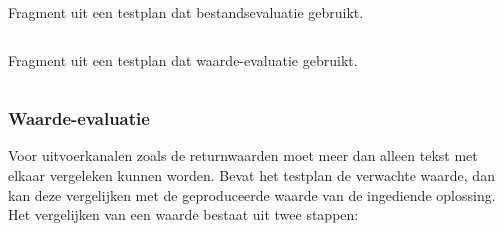 \begin{listing}
    \caption{Fragment uit een testplan dat bestandsevaluatie gebruikt.}
    \label{lst:testplan-file}
    \inputminted[breaklines]{json}{code/testplan-file.json}
\end{listing}

\begin{listing}
    \caption{Fragment uit een testplan dat waarde-evaluatie gebruikt.}
    \label{lst:testplan-value}
    \inputminted{json}{code/testplan-value.json}
\end{listing}

\subsubsection{Waarde-evaluatie}

Voor uitvoerkanalen zoals de returnwaarden moet meer dan alleen tekst met elkaar vergeleken kunnen worden.
Bevat het testplan de verwachte waarde, dan kan \tested{} deze vergelijken met de geproduceerde waarde van de ingediende oplossing.
Het vergelijken van een waarde bestaat uit twee stappen:

